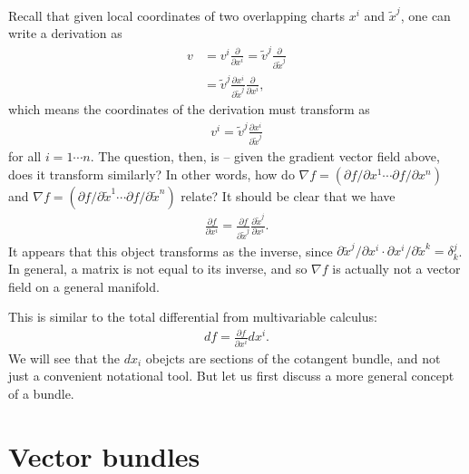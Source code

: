 \documentclass{../mathnotes}
\begin{document}
Recall that given local coordinates of two overlapping charts $x^i$ and $\tilde{x}^j$, one can write a derivation as
\begin{align*}
    v&=v^i\frac{\partial}{\partial x^i}=\tilde{v}^j\frac{\partial}{\partial \tilde{x}^j}\\
    &=\tilde{v}^j\frac{\partial x^i}{\partial \tilde{x}^j}\frac{\partial}{\partial x^i},
\end{align*}
which means the coordinates of the derivation must transform as
\begin{align*}
    v^i=\tilde{v}^j\frac{\partial x^i}{\partial \tilde{x}^j}
\end{align*}
for all $i=1\cdots n$. The question, then, is -- given the gradient vector field above, does it transform similarly?
In other words, how do $\nabla f = \left( \partial f/\partial x^1 \cdots \partial f/\partial x^n \right)
$ and $\nabla f = \left( \partial f/\partial \tilde{x}^1 \cdots \partial f/\partial \tilde{x}^n \right)$ relate?
It should be clear that we have
\begin{align*}
    \frac{\partial f}{\partial x^i}=\frac{\partial f}{\partial \tilde{x}^j}\frac{\partial\tilde{x}^j}{\partial x^i}.
\end{align*}
It appears that this object transforms as the inverse, since
$\partial \tilde{x}^j/\partial x^i\cdot\partial x^i/\partial\tilde{x}^k=\delta^j_k$.
In general, a matrix is not equal to its inverse, and so $\nabla f$ is actually not a vector field on a general manifold.

This is similar to the total differential from multivariable calculus:
\begin{align*}
    df=\frac{\partial f}{\partial x^i}dx^i.
\end{align*}
We will see that the $dx_i$ obejcts are sections of the cotangent bundle, and not just a convenient notational tool.
But let us first discuss a more general concept of a bundle.

\section{Vector bundles}
\end{document}
